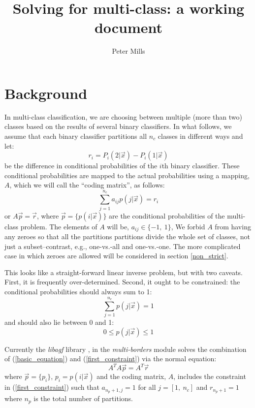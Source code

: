 \documentclass{article}
\begin{document}
\title{Solving for multi-class: a working document}

\author{Peter Mills\\}

\maketitle

\section{Background}

In multi-class classification, we are choosing between multiple (more than two)
classes based on the results of several binary classifiers.
In what follows, we assume that each binary classifier partitions all $n_c$
classes in different ways and let:
\begin{equation}
r_i=P_i(2|\vec x)-P_i(1|\vec x)
\label{rdef}
\end{equation}
be the difference in conditional probabilities of the $i$th binary classifier.
These conditional probabilities are mapped to the actual probabilities
using a mapping, $A$, which we will call the ``coding matrix'', as follows:
\begin{equation}
\sum_{j=1}^{n_c}a_{ij} p(j|\vec x)=r_i
\label{basic_equation}
\end{equation}
or $A \vec p=\vec r$, where $\vec p=\lbrace p(i|\vec x) \rbrace$ are the conditional probabilities
of the multi-class problem.
The elements of $A$ will be, $a_{ij} \in \lbrace -1, ~1 \rbrace$,
We forbid $A$ from having any zeroes so that all the partitions
partitions divide the whole set of classes, not just a subset--contrast, e.g.,
one-vs.-all and one-vs.-one.
The more complicated case in which zeroes are
allowed will be considered in section \ref{non_strict}.

This looks like a straight-forward linear inverse problem, but with two
caveats.  First, it is frequently over-determined.  Second, it ought to
be constrained: the conditional probabilities 
should always sum to 1:
\begin{equation}
\sum_{j=1}^{n_c} p(j|\vec x) = 1
\label{first_constraint}
\end{equation}
and should also lie between 0 and 1:
\begin{equation}
0 \le p(j|\vec x) \le 1
\end{equation}

Currently the {\it libagf} library \citep{Mills2011},
in the {\it multi-borders} module \citep{Mills2014} solves the 
combination of (\ref{basic_equation}) and (\ref{first_constraint}) via the
normal equation:
\begin{equation}
A^T A \vec p = A^T \vec r
\label{normal_eq}
\end{equation}
where $\vec p=\lbrace p_i \rbrace$, $p_i=p(i|\vec x)$ and the coding matrix,
$A$, includes the constraint in (\ref{first_constraint}) such that 
$a_{n_p+1, j}=1$ for all $j=[1,~n_c]$ and $r_{n_p+1}=1$ where $n_p$ is the total
number of partitions.
\end{document}
